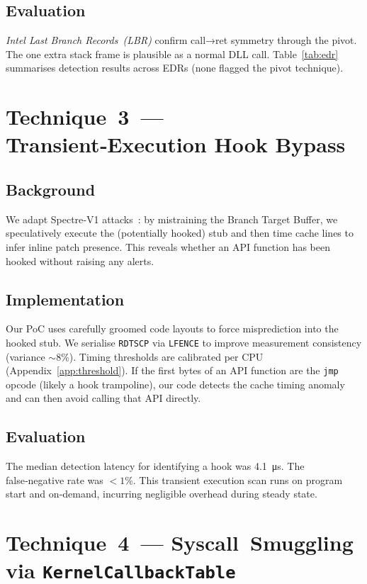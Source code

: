 \documentclass[11pt,letterpaper]{article}
\begin{document}
    \subsection{Evaluation}
    \emph{Intel Last Branch Records (LBR)} confirm call→ret symmetry through the pivot. The one extra stack frame is plausible as a normal DLL call. Table~\ref{tab:edr} summarises detection results across EDRs (none flagged the pivot technique).

    \section{Technique 3 — Transient‑Execution Hook Bypass}
    \label{sec:spec}
    \subsection{Background}
    We adapt Spectre‑V1 attacks~\cite{Kocher2019Spectre}: by mistraining the Branch Target Buffer, we speculatively execute the (potentially hooked) stub and then time cache lines to infer inline patch presence. This reveals whether an API function has been hooked without raising any alerts.

    \subsection{Implementation}
    Our PoC uses carefully groomed code layouts to force misprediction into the hooked stub. We serialise \texttt{RDTSCP} via \texttt{LFENCE} to improve measurement consistency (variance $\sim$8\%). Timing thresholds are calibrated per CPU (Appendix \ref{app:threshold}). If the first bytes of an API function are the \texttt{jmp} opcode (likely a hook trampoline), our code detects the cache timing anomaly and can then avoid calling that API directly.

    \subsection{Evaluation}
    The median detection latency for identifying a hook was \SI{4.1}{\micro\second}. The false‑negative rate was $<1$\%. This transient execution scan runs on program start and on‑demand, incurring negligible overhead during steady state.

    \section{Technique 4 — Syscall Smuggling via \texttt{KernelCallbackTable}}
    \label{sec:kct}
\end{document}
